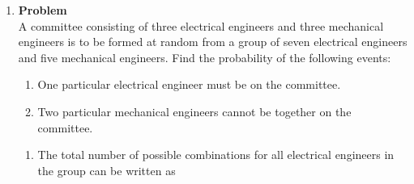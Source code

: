 \documentclass[12pt]{article}
\newenvironment{Ex}{\textbf{Problem}\vspace{.75em}\\}{}
\begin{document}
\begin{enumerate}
\begin{Ex}
\begin{solution}
\begin{enumerate}
        \cref{eq:5-var-declaration}, we are tasked to find
        $P(B|Y)$. Again, using the Total Probability Theorem
        \begin{equation}
          \label{eq:5b-sol}
          \begin{aligned}
            P(B|Y) &= \frac{B \cap Y}{Y} \\
            &= \frac{P(Y|B)P(B)}{P(Y|D)P(D) + P(Y|T)P(T) + P(Y|B)P(B)
              + P(Y|O)P(O)} \\
            &= 0.220588
          \end{aligned}
        \end{equation}
      \item Using the same declarations in
        \cref{eq:5-var-declaration}, we are tasked to find
        $P(O|Z)$. Again, using the Total Probability Theorem
        \begin{equation}
          \label{eq:5c-sol}
          \begin{aligned}
            P(O|Z) &= \frac{P(O \cap Z)}{P(Z)} \\
            &= \frac{P(Z|O)P(O)}{P(Z|D)P(D) + P(Z|T)P(T) + P(Z|B)P(B)
              + P(Z|O)P(O)} \\
            &= 0.442477
          \end{aligned}
        \end{equation}
      \end{enumerate}
    \end{solution}
  \end{Ex}
  \item
    \begin{Ex}
      A committee consisting of three electrical engineers and three
      mechanical engineers is to be formed at random from a group of
      seven electrical engineers and five mechanical engineers. Find
      the probability of the following events:
      \begin{enumerate}
      \item One particular electrical engineer must be on the committee.
      \item Two particular mechanical engineers cannot be together on
        the committee.
      \end{enumerate}
      \begin{solution} \hfill
        \begin{enumerate}
        \item The total number of possible combinations for all
          electrical engineers in the group can be written as

\end{enumerate}
\end{solution}
\end{Ex}
\end{enumerate}
\end{document}
